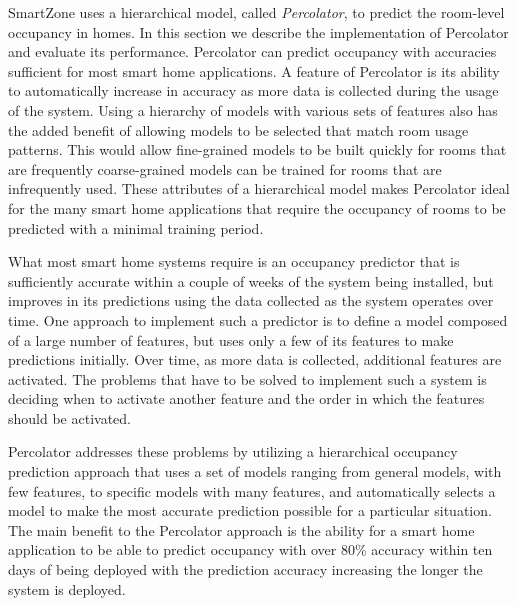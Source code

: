 SmartZone uses a hierarchical model, called {\em Percolator}, to predict the
room-level occupancy in homes. In this section we describe the implementation of
Percolator and evaluate its performance. Percolator can predict occupancy with
accuracies sufficient for most smart home applications. A feature of Percolator
is its ability to automatically increase in accuracy as more data is collected
during the usage of the system. Using a hierarchy of models with various sets of
features also has the added benefit of allowing models to be selected that match
room usage patterns. This would allow fine-grained models to be built quickly
for rooms that are frequently coarse-grained models can be trained for rooms
that are infrequently used. These attributes of a hierarchical model makes
Percolator ideal for the many smart home applications that require the occupancy
of rooms to be predicted with a minimal training period.



What most smart home systems require is an occupancy predictor that is
sufficiently accurate within a couple of weeks of the system being installed,
but improves in its predictions using the data collected as the system operates
over time. One approach to implement such a predictor is to define a model
composed of a large number of features, but uses only a few of its features to
make predictions initially. Over time, as more data is collected, additional
features are activated. The problems that have to be solved to implement such a
system is deciding when to activate another feature and the order in which the
features should be activated.



Percolator addresses these problems by utilizing a hierarchical occupancy
prediction approach that uses a set of models ranging from general models, with
few features, to specific models with many features, and automatically selects a
model to make the most accurate prediction possible for a particular
situation. The main benefit to the Percolator approach is the ability for a
smart home application to be able to predict occupancy with over 80\% accuracy
within ten days of being deployed with the prediction accuracy increasing the
longer the system is deployed.

